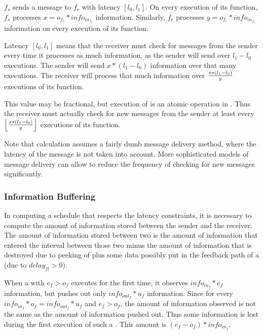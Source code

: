 {\filter} $f_s$ sends a message to {\filter} $f_r$ with latency
$[l_0,l_1]$.  On every execution of its {\work} function, {\filter}
$f_s$ processes $x = o_{f_s} * info_{in_{f_s}}$ information.
Similarly, {\filter} $f_r$ processes $y = o_{f_r} * info_{in_{f_r}}$
information on every execution of its {\work} function.

Latency $[l_0, l_1]$ means that the receiver must check for
messages from the sender every time it processes as much
information, as the sender will send over $l_1 - l_0$ executions.
The sender will send $x * (l_1 - l_0)$ information over that many
executions.  The receiver will process that much information over
${x * (l_1 - l_0) \over y}$ executions of its {\work} function.

This value may be fractional, but execution of {\filters} is an
atomic operation in {\StreamIt}.  Thus the receiver must actually
check for new messages from the sender at least every
$\left\lfloor {x * (l_1 - l_0) \over y}\right\rfloor$ executions
of its {\work} function.

Note that calculation assumes a fairly dumb message delivery
method, where the latency of the message is not taken into
account.  More sophisticated models of message delivery can allow
to reduce the frequency of checking for new messages
significantly.

\subsubsection{Information Buffering}

In computing a schedule that respects the latency constraints, it
is necessary to compute the amount of information stored between
the sender and the receiver.  The amount of information stored
between two {\filters} is the amount of information that entered the
interval between those two {\filters} minus the amount of
information that is destroyed due to peeking of {\filters} plus some
data possibly put in the feedback path of a {\feedbackloop} (due to
$delay_{fl} > 0$).

When a {\filter} with $e_f > o_f$ executes for the first time, it
observes $info_{in_f} * e_f$ information, but pushes out only
$info_{out_f} * u_f$ information.  Since for every {\filter}
$info_{in_f} * o_f = info_{out_f} * u_f$ and $e_f > o_f$, the
amount of information observed is not the same as the amount of
information pushed out.  Thus some information is lost during the
first execution of such a {\filter}.  This amount is $(e_f - o_f) *
info_{in_f}$.

